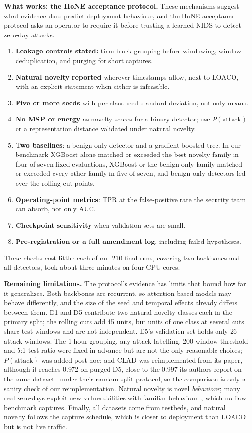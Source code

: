 \documentclass[conference]{IEEEtran}
\begin{document}
\label{sec:protocol}
\textbf{What works: the HoNE acceptance protocol.} These mechanisms suggest what evidence does predict deployment behaviour, and the HoNE acceptance protocol asks an operator to require it before trusting a learned NIDS to detect zero-day attacks:
\begin{enumerate}
\item \textbf{Leakage controls stated:} time-block grouping before windowing, window deduplication, and purging for short captures.
\item \textbf{Natural novelty reported} wherever timestamps allow, next to LOACO, with an explicit statement when either is infeasible.
\item \textbf{Five or more seeds} with per-class seed standard deviation, not only means.
\item \textbf{No MSP or energy} as novelty scores for a binary detector; use $P(\text{attack})$ or a representation distance validated under natural novelty.
\item \textbf{Two baselines}: a benign-only detector and a gradient-boosted tree. In our benchmark XGBoost alone matched or exceeded the best novelty family in four of seven fixed evaluations, XGBoost or the benign-only family matched or exceeded every other family in five of seven, and benign-only detectors led over the rolling cut-points.
\item \textbf{Operating-point metrics}: TPR at the false-positive rate the security team can absorb, not only AUC.
\item \textbf{Checkpoint sensitivity} when validation sets are small.
\item \textbf{Pre-registration or a full amendment log}, including failed hypotheses.
\end{enumerate}
These checks cost little: each of our 210 final runs, covering two backbones and all detectors, took about three minutes on four CPU cores.

\textbf{Remaining limitations.} The protocol's evidence has limits that bound how far it generalizes. Both backbones are recurrent, so attention-based models may behave differently, and the size of the seed and temporal effects already differs between them. D1 and D5 contribute two natural-novelty classes each in the primary split; the rolling cuts add 45 units, but units of one class at several cuts share test windows and are not independent. D5's validation set holds only 26 attack windows. The 1-hour grouping, any-attack labelling, 200-window threshold and 5:1 test ratio were fixed in advance but are not the only reasonable choices; $P(\text{attack})$ was added post hoc; and CLAD was reimplemented from its paper, although it reaches 0.972 on purged D5, close to the 0.997 its authors report on the same dataset~\cite{wilkie2026} under their random-split protocol, so the comparison is only a sanity check of our reimplementation. Natural novelty is novel \emph{behaviour}; many real zero-days exploit new vulnerabilities with familiar behaviour~\cite{jibunoh2026}, which no flow benchmark captures. Finally, all datasets come from testbeds, and natural novelty follows the capture schedule, which is closer to deployment than LOACO but is not live traffic.
\end{document}
